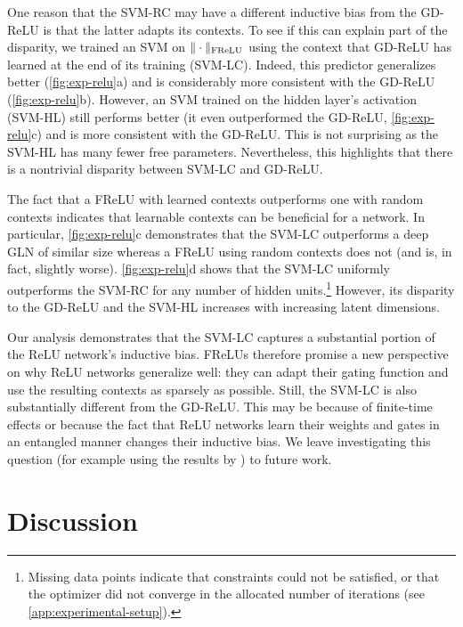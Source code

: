 \documentclass{article}
\theoremstyle{plain}
\theoremstyle{definition}
\theoremstyle{remark}
\begin{document}
One reason that the SVM-RC may have a different inductive bias from the GD-ReLU is that the latter adapts its contexts.
To see if this can explain part of the disparity, we trained an SVM on $\|\cdot\|_{\rm FReLU}$ using the context that GD-ReLU has learned at the end of its training (SVM-LC).
Indeed, this predictor generalizes better (\cref{fig:exp-relu}a) and is considerably more consistent with the GD-ReLU (\cref{fig:exp-relu}b).
However, an SVM trained on the hidden layer's activation (SVM-HL) still performs better (it even outperformed the GD-ReLU, \cref{fig:exp-relu}c) and is more consistent with the GD-ReLU.
This is not surprising as the SVM-HL has many fewer free parameters.
Nevertheless, this highlights that there is a nontrivial disparity between SVM-LC and GD-ReLU.

The fact that a FReLU with learned contexts outperforms one with random contexts indicates that learnable contexts can be beneficial for a network.
In particular, \cref{fig:exp-relu}c demonstrates that the SVM-LC outperforms a deep GLN of similar size whereas a FReLU using random contexts does not (and is, in fact, slightly worse).
\cref{fig:exp-relu}d shows that the SVM-LC uniformly outperforms the SVM-RC for any number of hidden units.\footnote{Missing data points indicate that constraints could not be satisfied, or that the optimizer did not converge in the allocated number of iterations (see \cref{app:experimental-setup}).}
However, its disparity to the GD-ReLU and the SVM-HL increases with increasing latent dimensions.

Our analysis demonstrates that the SVM-LC captures a substantial portion of the ReLU network's inductive bias.
FReLUs therefore promise a new perspective on why ReLU networks generalize well: they can adapt their gating function and use the resulting contexts as sparsely as possible.
Still, the SVM-LC is also substantially different from the GD-ReLU.
This may be because of finite-time effects or because the fact that ReLU networks learn their weights and gates in an entangled manner changes their inductive bias.
We leave investigating this question (for example using the results by \citet{lyu_gradient_2020}) to future work.

\section{Discussion}
\end{document}
